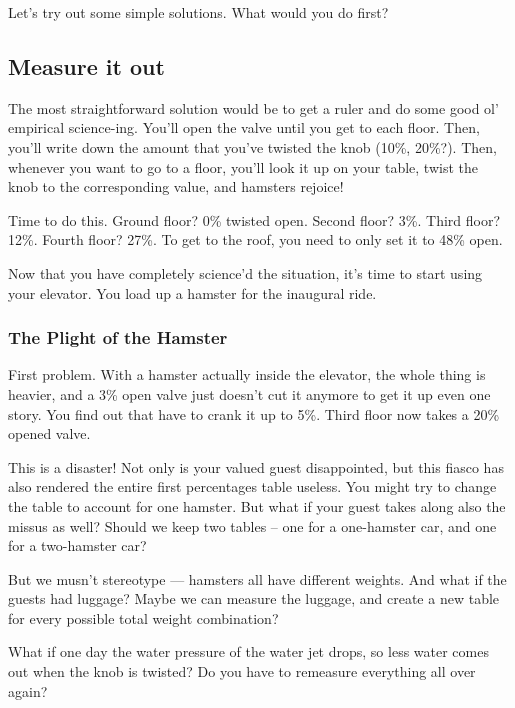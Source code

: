 \documentclass[]{article}
\begin{document}
Let's try out some simple solutions. What would you do first?

\hypertarget{measure-it-out}{%
\subsection{Measure it out}\label{measure-it-out}}

The most straightforward solution would be to get a ruler and do some good ol'
empirical science-ing. You'll open the valve until you get to each floor. Then,
you'll write down the amount that you've twisted the knob (10\%, 20\%?). Then,
whenever you want to go to a floor, you'll look it up on your table, twist the
knob to the corresponding value, and hamsters rejoice!

Time to do this. Ground floor? 0\% twisted open. Second floor? 3\%. Third floor?
12\%. Fourth floor? 27\%. To get to the roof, you need to only set it to 48\%
open.

Now that you have completely science'd the situation, it's time to start using
your elevator. You load up a hamster for the inaugural ride.

\hypertarget{the-plight-of-the-hamster}{%
\subsubsection{The Plight of the Hamster}\label{the-plight-of-the-hamster}}

First problem. With a hamster actually inside the elevator, the whole thing is
heavier, and a 3\% open valve just doesn't cut it anymore to get it up even one
story. You find out that have to crank it up to 5\%. Third floor now takes a
20\% opened valve.

This is a disaster! Not only is your valued guest disappointed, but this fiasco
has also rendered the entire first percentages table useless. You might try to
change the table to account for one hamster. But what if your guest takes along
also the missus as well? Should we keep two tables -- one for a one-hamster car,
and one for a two-hamster car?

But we musn't stereotype --- hamsters all have different weights. And what if
the guests had luggage? Maybe we can measure the luggage, and create a new table
for every possible total weight combination?

What if one day the water pressure of the water jet drops, so less water comes
out when the knob is twisted? Do you have to remeasure everything all over
again?
\end{document}
